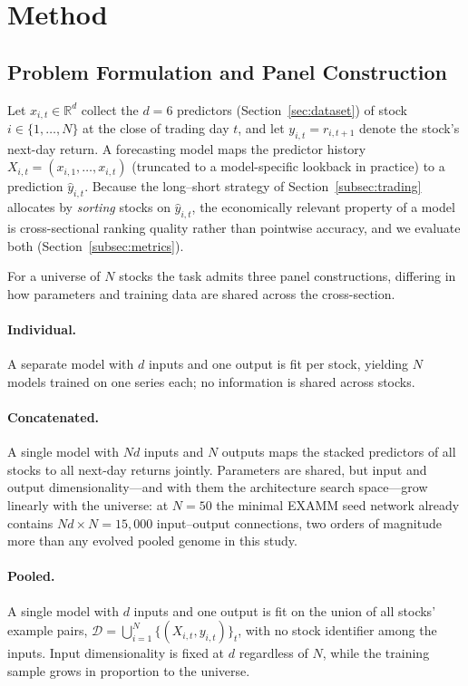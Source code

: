 \section{Method}

\subsection{Problem Formulation and Panel Construction}
\label{subsec:panel}

Let $x_{i,t}\in\mathbb{R}^{d}$ collect the $d=6$ predictors (Section~\ref{sec:dataset}) of stock $i\in\{1,\dots,N\}$ at the close of trading day $t$, and let $y_{i,t}=r_{i,t+1}$ denote the stock's next-day return. A forecasting model maps the predictor history $X_{i,t}=(x_{i,1},\dots,x_{i,t})$ (truncated to a model-specific lookback in practice) to a prediction $\hat{y}_{i,t}$. Because the long--short strategy of Section~\ref{subsec:trading} allocates by \emph{sorting} stocks on $\hat{y}_{i,t}$, the economically relevant property of a model is cross-sectional ranking quality rather than pointwise accuracy, and we evaluate both (Section~\ref{subsec:metrics}).

For a universe of $N$ stocks the task admits three panel constructions, differing in how parameters and training data are shared across the cross-section.

\paragraph{Individual.} A separate model with $d$ inputs and one output is fit per stock, yielding $N$ models trained on one series each; no information is shared across stocks.

\paragraph{Concatenated.} A single model with $Nd$ inputs and $N$ outputs maps the stacked predictors of all stocks to all next-day returns jointly. Parameters are shared, but input and output dimensionality---and with them the architecture search space---grow linearly with the universe: at $N=50$ the minimal EXAMM seed network already contains $Nd\times N=15{,}000$ input--output connections, two orders of magnitude more than any evolved pooled genome in this study.

\paragraph{Pooled.} A single model with $d$ inputs and one output is fit on the union of all stocks' example pairs, $\mathcal{D}=\bigcup_{i=1}^{N}\{(X_{i,t},y_{i,t})\}_{t}$, with no stock identifier among the inputs. Input dimensionality is fixed at $d$ regardless of $N$, while the training sample grows in proportion to the universe.

